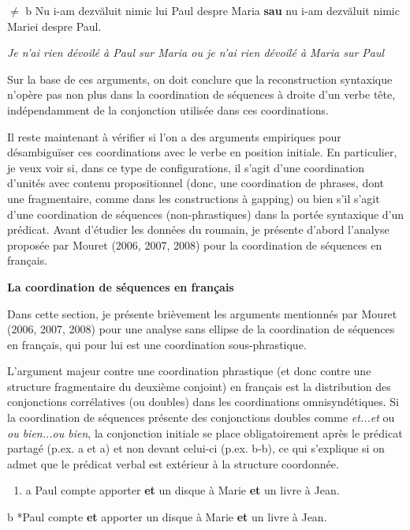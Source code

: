 ${\neq}$  b  Nu i-am dezvăluit nimic lui Paul despre Maria \textbf{sau} nu i-am dezvăluit nimic Mariei despre Paul.

\textit{Je n'ai rien dévoilé à Paul sur Maria ou je n'ai rien dévoilé à Maria sur Paul} 

Sur la base de ces arguments, on doit conclure que la reconstruction syntaxique n'opère pas non plus dans la coordination de séquences à droite d'un verbe tête, indépendamment de la conjonction utilisée dans ces coordinations.

Il reste maintenant à vérifier si l'on a des arguments empiriques pour désambiguïser ces coordinations avec le verbe en position initiale. En particulier, je veux voir si, dans ce type de configurations, il s'agit d'une coordination d'unités avec contenu propositionnel (donc, une coordination de phrases, dont une fragmentaire, comme dans les constructions à gapping) ou bien s'il s'agit d'une coordination de séquences (non-phrastiques) dans la portée syntaxique d'un prédicat. Avant d'étudier les données du roumain, je présente d'abord l'analyse proposée par Mouret (2006, 2007, 2008) pour la coordination de séquences en français.

{\bfseries
\label{bkm:Ref302392659}La coordination de séquences en français}

Dans cette section, je présente brièvement les arguments mentionnés par Mouret (2006, 2007, 2008) pour une analyse sans ellipse de la coordination de séquences en français, qui pour lui est une coordination sous-phrastique. 

L'argument majeur contre une coordination phrastique (et donc contre une structure fragmentaire du deuxième conjoint) en français est la distribution des conjonctions corrélatives (ou doubles) dans les coordinations omnisyndétiques. Si la coordination de séquences présente des conjonctions doubles comme \textit{et...et} ou \textit{ou bien...ou bien}, la conjonction initiale se place obligatoirement après le prédicat partagé (p.ex. a et a) et non devant celui-ci (p.ex. b-b), ce qui s'explique si on admet que le prédicat verbal est extérieur à la structure coordonnée. 


\begin{enumerate}
\item \label{bkm:Ref302394829}a   Paul compte apporter \textbf{et} un disque à Marie \textbf{et} un livre à Jean. 


\end{enumerate}
  b  *Paul compte \textbf{et} apporter un disque à Marie \textbf{et} un livre à Jean.  


